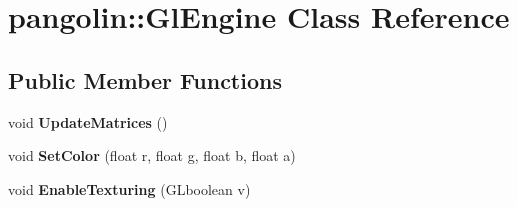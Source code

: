 \hypertarget{classpangolin_1_1_gl_engine}{}\section{pangolin\+:\+:Gl\+Engine Class Reference}
\label{classpangolin_1_1_gl_engine}
\subsection*{Public Member Functions}
\begin{DoxyCompactItemize}
\item 
void {\bfseries Update\+Matrices} ()\hypertarget{classpangolin_1_1_gl_engine_a85af054f66c735a16eda03b242630be8}{}\label{classpangolin_1_1_gl_engine_a85af054f66c735a16eda03b242630be8}

\item 
void {\bfseries Set\+Color} (float r, float g, float b, float a)\hypertarget{classpangolin_1_1_gl_engine_ade54b722f63796c94a4a0f3fc4193cc4}{}\label{classpangolin_1_1_gl_engine_ade54b722f63796c94a4a0f3fc4193cc4}

\item 
void {\bfseries Enable\+Texturing} (G\+Lboolean v)\hypertarget{classpangolin_1_1_gl_engine_aa6167f2c360aca0dc93856181de29178}{}\label{classpangolin_1_1_gl_engine_aa6167f2c360aca0dc93856181de29178}

\end{DoxyCompactItemize}
